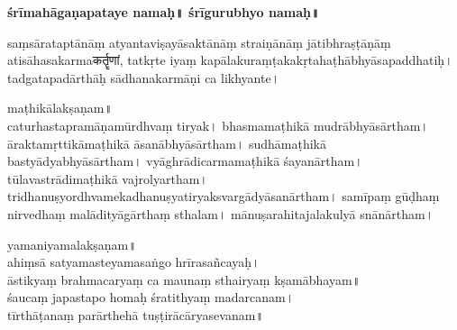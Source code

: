 






\newpage
\null\vspace{0.1cm}

\begin{sans}
\centerline{}
\bigskip

\begin{center}
{\Large\bfseries śrīmahāgaṇapataye namaḥ\!॥ 
śrīgurubhyo namaḥ\!॥}
\end{center}
\bigskip

saṃsārataptānāṃ\endnote{saṃsāra°] P, saṃsārāsāra° M.} %
atyantaviṣayāsaktānāṃ straiṇānāṃ jāti\-bhraṣṭāṇāṃ atisāhasakarmaकर्तॄणां,  tatkṛte iyaṃ kapālakuraṃṭakakṛtahaṭhābhyāsapaddhatiḥ\!।\endnote{°paddhatiḥ] \textit{emend.}, °paddhaty° M.} tadgata\-padā\-rthāḥ\endnote{tadgata°] \textit{emend.}, aṃtargata° M.} sādhanakarmāṇi\endnote{°karmāṇi] P, °karmāṇī M.} ca  likhyante\!।

maṭhikālakṣaṇam\!॥\\ %
caturhastapramāṇamūrdhvaṃ\endnote{ūrdhvaṃ] P, ūrdhva° M.} tiryak\!। bhasmamaṭhikā mudrābhyāsārtham\!। āraktamṛttikāmaṭhikā āsanābhyā\-sārtham\!। sudhāmaṭhikā bastyādyabhyāsārtham\endnote{bastyādya°] \textit{conj.}, bastyārthā° M.}\!। vyāghrādicarmamaṭhikā śayanārtham\!। tūlavastrādimaṭhikā vajrolyartham\!। tridhanuṣyordhvamekadhanu\-ṣya\-tirya\-ksvargādyāsanārtham\!। samīpaṃ\endnote{samīpaṃ] P, samīpa M.} gūḍhaṃ nirvedhaṃ malādityāgārthaṃ sthalam\!। mānuṣarahitajalakulyā snānārtham\!।

yamaniyamalakṣaṇam\!॥\\ %
ahiṃsā satyamasteyamasaṅgo hrīrasañcayaḥ\!।\\
āstikyaṃ brahmacaryaṃ ca maunaṃ\endnote{maunaṃ] P, maunyaṃ M.} sthairyaṃ kṣamābhayam\!॥\\
śaucaṃ japastapo homaḥ śratithyaṃ madarcanam\!।\\ %
tīrthāṭanaṃ parārthehā tuṣṭirācāryasevanam\!॥
\vskip 16pt


\end{sans}
